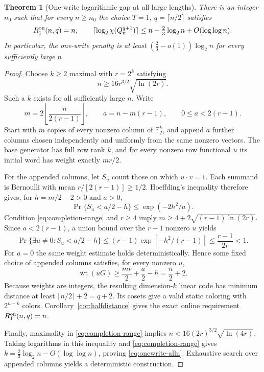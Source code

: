 \documentclass[11pt,a4paper]{article}
\newtheorem{theorem}{Theorem}[section]
\newcommand{\F}{\mathbb F_2}
\begin{document}
\begin{theorem}[One-write logarithmic gap at all large lengths]\label{thm:onewrite-alln}
There is an integer $n_0$ such that for every $n\ge n_0$ the choice $T=1$, $q=\lceil n/2\rceil$ satisfies
\begin{equation}\label{eq:onewrite-alln}
 R_1^{\rm on}(n,q)=n,\qquad
 \lceil\log_2\chi(Q_n^{q+1})\rceil
 \le n-\tfrac23\log_2 n+O(\log\log n).
\end{equation}
In particular, the one-write penalty is at least
$(\tfrac23-o(1))\log_2 n$ for every sufficiently large $n$.
\end{theorem}
\begin{proof}
Choose $k\ge2$ maximal with $r=2^k$ satisfying
\begin{equation}\label{eq:completion-range}
 n\ge 16r^{3/2}\sqrt{\ln(2r)}.
\end{equation}
Such a $k$ exists for all sufficiently large $n$. Write
\[
 m=2\left\lfloor\frac{n}{2(r-1)}\right\rfloor,\qquad
 a=n-m(r-1),\qquad 0\le a<2(r-1).
\]
Start with $m$ copies of every nonzero column of $\F^k$, and append $a$ further columns chosen independently and uniformly from the same nonzero vectors. The base generator has full row rank $k$, and for every nonzero row functional $u$ its initial word has weight exactly $mr/2$.

For the appended columns, let $S_u$ count those on which $u\cdot v=1$. Each summand is Bernoulli with mean $r/[2(r-1)]\ge 1/2$. Hoeffding's inequality therefore gives, for $h=m/2-2>0$ and $a>0$,
\[
 \Pr\{S_u<a/2-h\}\le\exp(-2h^2/a).
\]
Condition \eqref{eq:completion-range} and $r\ge4$ imply
$m\ge4+2\sqrt{(r-1)\ln(2r)}$. Since $a<2(r-1)$, a union bound over the $r-1$ nonzero $u$ yields
\[
 \Pr\{\exists u\ne0:S_u<a/2-h\}
 \le (r-1)\exp[-h^2/(r-1)]
 \le\frac{r-1}{2r}<1.
\]
For $a=0$ the same weight estimate holds deterministically. Hence some fixed choice of appended columns satisfies, for every nonzero $u$,
\[
 \operatorname{wt}(uG)\ge\frac{mr}{2}+\frac a2-h
 =\frac n2+2.
\]
Because weights are integers, the resulting dimension-$k$ linear code has minimum distance at least $\lceil n/2\rceil+2=q+2$. Its cosets give a valid static coloring with $2^{n-k}$ colors. Corollary~\ref{cor:halfdistance} gives the exact online requirement $R_1^{\rm on}(n,q)=n$.

Finally, maximality in \eqref{eq:completion-range} implies
$n<16(2r)^{3/2}\sqrt{\ln(4r)}$. Taking logarithms in this inequality and \eqref{eq:completion-range} gives
$k=\frac23\log_2 n-O(\log\log n)$, proving \eqref{eq:onewrite-alln}. Exhaustive search over appended columns yields a deterministic construction.
\end{proof}
\end{document}
